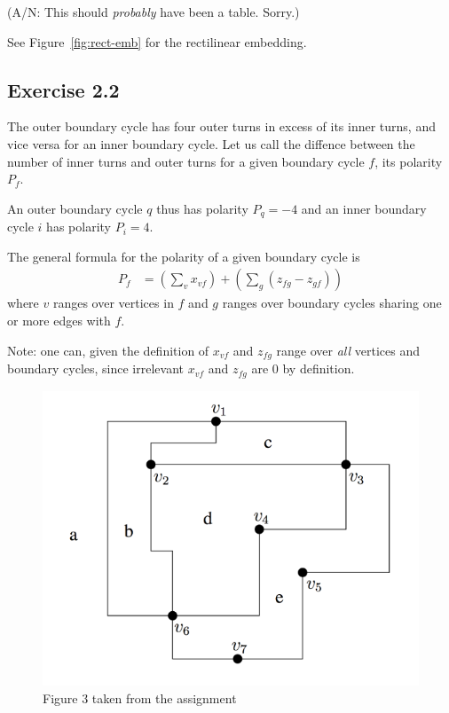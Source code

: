 (A/N: This should \emph{probably} have been a table. Sorry.)

See Figure~\ref{fig:rect-emb} for the rectilinear embedding.

\subsection{Exercise 2.2}

The outer boundary cycle has four outer turns in excess of its inner turns, and vice
versa for an inner boundary cycle. Let us call the diffence between the number of inner turns 
and outer turns for a given boundary cycle $f$, its polarity $P_f$.

An outer boundary cycle $q$ thus has polarity $P_q = -4$ and an inner boundary cycle $i$ has polarity $P_i = 4$.

The general formula for the polarity of a given boundary cycle is
\begin{align*}
  P_f &= \left(\sum_v x_{vf}\right) + \left(\sum_g ( z_{fg} - z_{gf} ) \right)
\end{align*}
where $v$ ranges over vertices in $f$ and $g$ ranges over boundary cycles sharing one or more edges
with $f$.

Note: one can, given the definition of $x_{vf}$ and $z_{fg}$ range over \emph{all} vertices and 
boundary cycles, since irrelevant $x_{vf}$ and $z_{fg}$ are $0$ by definition.

\begin{figure}
  \label{fig:rect-layout}
  \begin{center}
    \includegraphics[scale=0.5]{img/fig3.png}
  \end{center}
  \caption{Figure 3 taken from the assignment}
\end{figure}

